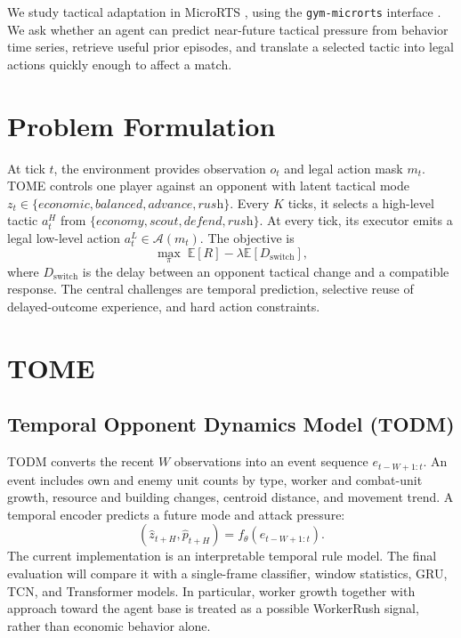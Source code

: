 \documentclass[11pt]{article}
\begin{document}
We study tactical adaptation in MicroRTS \citep{ontanon2013microrts}, using
the \texttt{gym-microrts} interface \citep{huang2021gymmicrorts}. We ask whether
an agent can predict near-future tactical pressure from behavior time series,
retrieve useful prior episodes, and translate a selected tactic into legal
actions quickly enough to affect a match.

\section{Problem Formulation}

At tick $t$, the environment provides observation $o_t$ and legal action mask
$m_t$. TOME controls one player against an opponent with latent tactical mode
$z_t \in \{\textit{economic}, \textit{balanced}, \textit{advance},
\textit{rush}\}$. Every $K$ ticks, it selects a high-level tactic $a^H_t$ from
$\{\textit{economy},\textit{scout},\textit{defend},\textit{rush}\}$. At every
tick, its executor emits a legal low-level action $a^L_t \in \mathcal{A}(m_t)$.
The objective is
\[
\max_{\pi} \; \mathbb{E}[R] - \lambda\mathbb{E}[D_{\mathrm{switch}}],
\]
where $D_{\mathrm{switch}}$ is the delay between an opponent tactical change
and a compatible response. The central challenges are temporal prediction,
selective reuse of delayed-outcome experience, and hard action constraints.

\section{TOME}

\subsection{Temporal Opponent Dynamics Model (TODM)}

TODM converts the recent $W$ observations into an event sequence
$e_{t-W+1:t}$. An event includes own and enemy unit counts by type, worker and
combat-unit growth, resource and building changes, centroid distance, and
movement trend. A temporal encoder predicts a future mode and attack pressure:
\[
(\hat z_{t+H},\hat p_{t+H})=f_\theta(e_{t-W+1:t}).
\]
The current implementation is an interpretable temporal rule model. The final
evaluation will compare it with a single-frame classifier, window statistics,
GRU, TCN, and Transformer models. In particular, worker growth together with
approach toward the agent base is treated as a possible WorkerRush signal,
rather than economic behavior alone.
\end{document}
